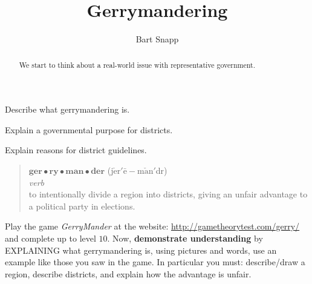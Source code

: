 \documentclass[noauthor,nooutcomes,hints,handout]{ximera}
\title{Gerrymandering}
\author{Bart Snapp}
\begin{document}
\begin{abstract}
  We start to think about a real-world issue with representative government.
\end{abstract}
\maketitle

\begin{listOutcomes}
\item Describe what gerrymandering is.
\item Explain a governmental purpose for districts.
\item Explain reasons for district guidelines.
\end{listOutcomes}
\begin{mdframed}[style=OutcomeStyle]
\begin{quote}
  $\textbf{ger}\bullet\textbf{ry}\bullet\textbf{man}\bullet\textbf{der}$ (j$\check{\text{e}}$r$'\bar{\text{e}}-$m$\check{\text{a}}$n$'$d{}r)
  \\
  
  \textit{verb}\\

  
\quad to intentionally divide a region into districts, giving an
unfair advantage to a political party in elections.
\end{quote}
\end{mdframed}




\mynewpage






\begin{question}
  Play the game \textsl{GerryMander} at the website:
  \url{http://gametheorytest.com/gerry/} and complete up to level $10$.
  Now, \textbf{demonstrate understanding} by EXPLAINING what
  gerrymandering is, using pictures and words, use an example like
  those you saw in the game. In particular you must: describe/draw a
  region, describe districts, and explain how the advantage is unfair.
  
\end{question}


\mynewpage
\end{document}
